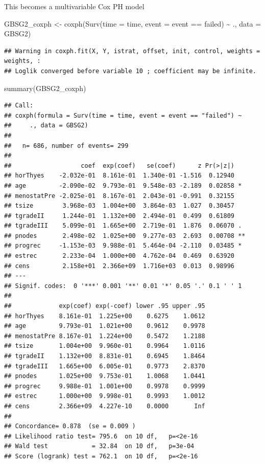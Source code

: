 \documentclass[
]{book}
\makeatletter
\newenvironment{Shaded}{\begin{snugshade}}{\end{snugshade}}
\newcommand{\AttributeTok}[1]{\textcolor[rgb]{0.61,0.61,0.61}{#1}}
\newcommand{\FunctionTok}[1]{\textcolor[rgb]{0,0,0}{#1}}
\newcommand{\NormalTok}[1]{#1}
\newcommand{\OtherTok}[1]{\textcolor[rgb]{0.37,0.37,0.37}{#1}}
\newcommand{\SpecialCharTok}[1]{\textcolor[rgb]{0,0,0}{#1}}
\newcommand{\StringTok}[1]{\textcolor[rgb]{0.5,0.5,0.5}{#1}}
\newenvironment{kframe}{%
\medskip{}
\setlength{\fboxsep}{.8em}
 \def\at@end@of@kframe{}%
 \ifinner\ifhmode%
  \def\at@end@of@kframe{\end{minipage}}%
  \begin{minipage}{\columnwidth}%
 \fi\fi%
 \def\FrameCommand##1{\hskip\@totalleftmargin \hskip-\fboxsep
 \colorbox{shadecolor}{##1}\hskip-\fboxsep
     \hskip-\linewidth \hskip-\@totalleftmargin \hskip\columnwidth}%
 \MakeFramed {\advance\hsize-\width
   \@totalleftmargin\z@ \linewidth\hsize
   \@setminipage}}%
 {\par\unskip\endMakeFramed%
 \at@end@of@kframe}
\renewenvironment{Shaded}{\begin{kframe}}{\end{kframe}}
\makeatother
\begin{document}
This becomes a multivariable Cox PH model

\begin{Shaded}
\begin{Highlighting}[]
\NormalTok{GBSG2\_coxph }\OtherTok{\textless{}{-}} \FunctionTok{coxph}\NormalTok{(}\FunctionTok{Surv}\NormalTok{(}\AttributeTok{time =}\NormalTok{ time, }\AttributeTok{event =}\NormalTok{ event }\SpecialCharTok{==} \StringTok{\textquotesingle{}failed\textquotesingle{}}\NormalTok{) }\SpecialCharTok{\textasciitilde{}}\NormalTok{ .,}
                     \AttributeTok{data =}\NormalTok{ GBSG2)}
\end{Highlighting}
\end{Shaded}

\begin{verbatim}
## Warning in coxph.fit(X, Y, istrat, offset, init, control, weights = weights, :
## Loglik converged before variable 10 ; coefficient may be infinite.
\end{verbatim}

\begin{Shaded}
\begin{Highlighting}[]
\FunctionTok{summary}\NormalTok{(GBSG2\_coxph)}
\end{Highlighting}
\end{Shaded}

\begin{verbatim}
## Call:
## coxph(formula = Surv(time = time, event = event == "failed") ~ 
##     ., data = GBSG2)
## 
##   n= 686, number of events= 299 
## 
##                   coef  exp(coef)   se(coef)      z Pr(>|z|)   
## horThyes    -2.032e-01  8.161e-01  1.340e-01 -1.516  0.12940   
## age         -2.090e-02  9.793e-01  9.548e-03 -2.189  0.02858 * 
## menostatPre -2.025e-01  8.167e-01  2.043e-01 -0.991  0.32155   
## tsize        3.968e-03  1.004e+00  3.864e-03  1.027  0.30457   
## tgradeII     1.244e-01  1.132e+00  2.494e-01  0.499  0.61809   
## tgradeIII    5.099e-01  1.665e+00  2.719e-01  1.876  0.06070 . 
## pnodes       2.498e-02  1.025e+00  9.277e-03  2.693  0.00708 **
## progrec     -1.153e-03  9.988e-01  5.464e-04 -2.110  0.03485 * 
## estrec       2.233e-04  1.000e+00  4.762e-04  0.469  0.63920   
## cens         2.158e+01  2.366e+09  1.716e+03  0.013  0.98996   
## ---
## Signif. codes:  0 '***' 0.001 '**' 0.01 '*' 0.05 '.' 0.1 ' ' 1
## 
##             exp(coef) exp(-coef) lower .95 upper .95
## horThyes    8.161e-01  1.225e+00    0.6275    1.0612
## age         9.793e-01  1.021e+00    0.9612    0.9978
## menostatPre 8.167e-01  1.224e+00    0.5472    1.2188
## tsize       1.004e+00  9.960e-01    0.9964    1.0116
## tgradeII    1.132e+00  8.831e-01    0.6945    1.8464
## tgradeIII   1.665e+00  6.005e-01    0.9773    2.8370
## pnodes      1.025e+00  9.753e-01    1.0068    1.0441
## progrec     9.988e-01  1.001e+00    0.9978    0.9999
## estrec      1.000e+00  9.998e-01    0.9993    1.0012
## cens        2.366e+09  4.227e-10    0.0000       Inf
## 
## Concordance= 0.878  (se = 0.009 )
## Likelihood ratio test= 795.6  on 10 df,   p=<2e-16
## Wald test            = 32.84  on 10 df,   p=3e-04
## Score (logrank) test = 762.1  on 10 df,   p=<2e-16
\end{verbatim}
\end{document}
